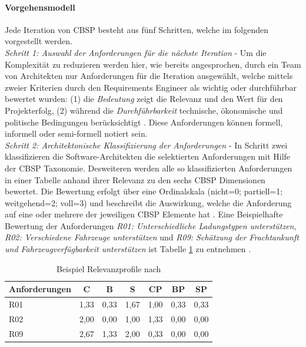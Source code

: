 \paragraph{Vorgehensmodell} 
Jede Iteration von CBSP besteht aus f\"unf Schritten, welche im folgenden vorgestellt werden. \\

\emph{Schritt 1: Auswahl der Anforderungen f\"ur die n\"achste Iteration} - 
Um die Komplexit\"at zu reduzieren werden hier, wie bereits angesprochen, durch ein Team von Architekten nur Anforderungen f\"ur die Iteration ausgew\"ahlt, welche mittels zweier Kriterien durch den Requirements Engineer als wichtig oder durchf\"uhrbar bewertet wurden: (1) die \textit{Bedeutung} zeigt die Relevanz und den Wert f\"ur den Projekterfolg, (2) w\"ahrend die \textit{Durchf\"uhrbarkeit} technische, \"okonomische und politische Bedingungen ber\"ucksichtigt \cite{Gru01}. Diese Anforderungen k\"onnen formell, informell oder semi-formell notiert sein. \\

\emph{Schritt 2: Architektonische Klassifizierung der Anforderungen} - 
In Schritt zwei klassifizieren die Software-Architekten die selektierten Anforderungen mit Hilfe der CBSP Taxonomie. Desweiteren werden alle so klassifizierten Anforderungen in einer Tabelle anhand ihrer Relevanz zu den sechs CBSP Dimensionen bewertet. Die Bewertung erfolgt \"uber eine Ordinalskala (nicht=0; partiell=1; weitgehend=2; voll=3) und beschreibt die Auswirkung, welche die Anforderung auf eine oder mehrere der jeweiligen CBSP Elemente hat \cite{Gru01}. Eine Beispielhafte Bewertung der Anforderungen \textit{R01: Unterschiedliche Ladungstypen unterst\"utzen}, \textit{R02: Verschiedene Fahrzeuge unterst\"utzen} und \textit{R09: Sch\"atzung der Frachtankunft und Fahrzeugverf\"ugbarkeit unterst\"utzen} ist Tabelle \ref{tab:relevance_profiles} zu entnehmen \cite{Gru01}. 

\begin{table}[h] %
\caption{Beispiel Relevanzprofile nach \cite{Gru01}}
\centering
\begin{tabular}{|l|c|c|c|c|c|c|}
\hline 
\textbf{Anforderungen} & \textbf{C} & \textbf{B} & \textbf{S} & \textbf{CP} & \textbf{BP} & \textbf{SP} \\ 
\hline 
R01 & 1,33 & 0,33 & \cellcolor{Gray} 1,67 & 1,00 & 0,33 & 0,33 \\ 
\hline 
R02 & \cellcolor{Gray} 2,00 & 0,00 & 1,00 & 1,33 & 0,00 & 0,00 \\ 
\hline 
R09 & \cellcolor{Gray} 2,67 & 1,33 & 2,00 & 0,33 & 0,00 & 0,00 \\ 
\hline 
\end{tabular} 
\label{tab:relevance_profiles}
\end{table}

